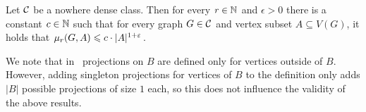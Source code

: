 \begin{lemma}\label{lem:projection-complexity-nd}
Let $\mathcal{C}$ be a nowhere dense class. Then for every $r\in \mathbb{N}$ and $\epsilon>0$ there is 
  a constant $c\in \mathbb{N}$ such that for every graph $G\in \mathcal{C}$ and vertex subset $A\subseteq V(G)$, 
  it holds that $\mu_r(G,A)\leqslant c\cdot |A|^{1+\varepsilon}$.
\end{lemma}

We note that in~\cite{drange2016kernelization,eickmeyer2016neighborhood} projections on $B$ are defined only for vertices outside of $B$. 
However, adding singleton projections for vertices of $B$ to the definition only adds $|B|$ possible projections of size $1$ each, so this does not influence the validity of the above results.

